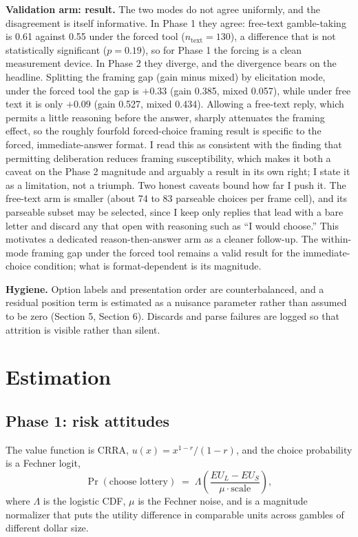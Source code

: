 \documentclass[11pt]{article}
\begin{document}
\textbf{Validation arm: result.} The two modes do not agree uniformly, and the disagreement is
itself informative. In Phase 1 they agree: free-text gamble-taking is 0.61 against 0.55 under the
forced tool ($n_{\text{text}} = 130$), a difference that is not statistically significant
($p = 0.19$), so for Phase 1 the forcing is a clean measurement device. In Phase 2 they diverge,
and the divergence bears on the headline. Splitting the framing gap (gain minus mixed) by
elicitation mode, under the forced tool the gap is $+0.33$ (gain 0.385, mixed 0.057), while under
free text it is only $+0.09$ (gain 0.527, mixed 0.434). Allowing a free-text reply, which permits a
little reasoning before the answer, sharply attenuates the framing effect, so the roughly fourfold
forced-choice framing result is specific to the forced, immediate-answer format. I read this as
consistent with the finding that permitting deliberation reduces framing susceptibility, which
makes it both a caveat on the Phase 2 magnitude and arguably a result in its own right; I state it
as a limitation, not a triumph. Two honest caveats bound how far I push it. The free-text arm is
smaller (about 74 to 83 parseable choices per frame cell), and its parseable subset may be
selected, since I keep only replies that lead with a bare letter and discard any that open with
reasoning such as ``I would choose.'' This motivates a dedicated reason-then-answer arm as a
cleaner follow-up. The within-mode framing gap under the forced tool remains a valid result for the
immediate-choice condition; what is format-dependent is its magnitude.

\textbf{Hygiene.} Option labels and presentation order are counterbalanced, and a residual position
term is estimated as a nuisance parameter rather than assumed to be zero (Section 5, Section 6).
Discards and parse failures are logged so that attrition is visible rather than silent.

\section{Estimation}

\subsection{Phase 1: risk attitudes}

The value function is CRRA, $u(x) = x^{1-r}/(1-r)$, and the choice probability is a Fechner logit,
\[
  \Pr(\text{choose lottery}) \;=\; \Lambda\!\left(\frac{EU_L - EU_S}{\mu \cdot \text{scale}}\right),
\]
where $\Lambda$ is the logistic CDF, $\mu$ is the Fechner noise, and  is a magnitude
normalizer that puts the utility difference in comparable units across gambles of different dollar
size.
\end{document}

